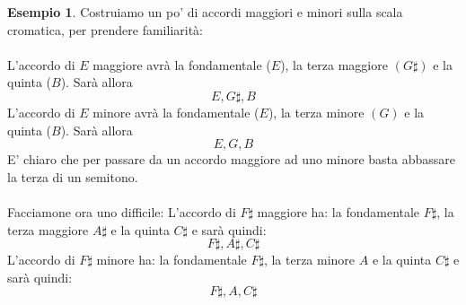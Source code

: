 \documentclass[12pt,a4paper]{report}
\theoremstyle{definition}
\theoremstyle{Theorem}
\theoremstyle{definition}
\newtheorem{Ex}[Def]{Esempio}
\theoremstyle{definition}
\theoremstyle{definition}
\begin{document}
	 		\begin{Ex}
	 			Costruiamo un po' di accordi maggiori e minori sulla scala cromatica, per prendere familiarità:\\
	 			\\
	 			L'accordo di $E$ maggiore avrà la fondamentale ($E$), la terza maggiore $(G\sharp)$ e la quinta ($B$). Sarà allora
	 			$$E,G\sharp,B$$
	 			L'accordo di $E$ minore avrà la fondamentale ($E$), la terza minore $(G)$ e la quinta ($B$). Sarà allora 
	 			$$E,G,B$$
	 			E' chiaro che per passare da un accordo maggiore ad uno minore basta abbassare la terza di un semitono.\\
	 			\\
	 			Facciamone ora uno difficile: L'accordo di $F\sharp$ maggiore ha: la fondamentale $F\sharp$, la terza maggiore $A\sharp$ e la quinta $C\sharp$ e sarà quindi:
	 			$$F\sharp,A\sharp,C\sharp$$
	 			L'accordo di $F\sharp$ minore ha: la fondamentale $F\sharp$, la terza minore $A$ e la quinta $C\sharp$ e sarà quindi:
	 			$$F\sharp,A,C\sharp$$
	 		\end{Ex}
\end{document}

